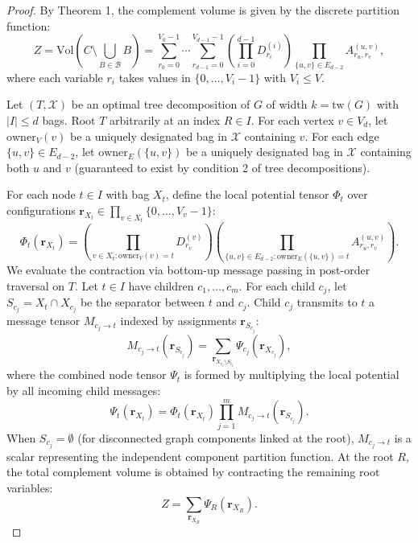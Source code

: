 \documentclass[11pt,a4paper]{article}
\theoremstyle{plain}
\theoremstyle{definition}
\begin{document}
\begin{proof}
By Theorem 1, the complement volume is given by the discrete partition function:
\begin{equation}
\label{eq:clean_partition}
Z = \mathrm{Vol}\left(C \setminus \bigcup_{B \in \mathcal{B}} B\right) = \sum_{r_0=0}^{V_0-1} \cdots \sum_{r_{d-1}=0}^{V_{d-1}-1} \left(\prod_{i=0}^{d-1} D^{(i)}_{r_i}\right) \prod_{\{u, v\} \in E_{d-2}} A^{(u, v)}_{r_u, r_v},
\end{equation}
where each variable $r_i$ takes values in $\{0, \dots, V_i - 1\}$ with $V_i \le V$.

Let $(T, \mathcal{X})$ be an optimal tree decomposition of $G$ of width $k = \mathrm{tw}(G)$ with $|I| \le d$ bags. Root $T$ arbitrarily at an index $R \in I$. For each vertex $v \in V_d$, let $\mathrm{owner}_V(v)$ be a uniquely designated bag in $\mathcal{X}$ containing $v$. For each edge $\{u, v\} \in E_{d-2}$, let $\mathrm{owner}_E(\{u, v\})$ be a uniquely designated bag in $\mathcal{X}$ containing both $u$ and $v$ (guaranteed to exist by condition 2 of tree decompositions).

For each node $t \in I$ with bag $X_t$, define the local potential tensor $\Phi_t$ over configurations $\mathbf{r}_{X_t} \in \prod_{v \in X_t} \{0, \dots, V_v - 1\}$:
\begin{equation}
\Phi_t(\mathbf{r}_{X_t}) = \left(\prod_{v \in X_t : \mathrm{owner}_V(v) = t} D^{(v)}_{r_v}\right) \left(\prod_{\{u, v\} \in E_{d-2} : \mathrm{owner}_E(\{u, v\}) = t} A^{(u, v)}_{r_u, r_v}\right).
\end{equation}
We evaluate the contraction via bottom-up message passing in post-order traversal on $T$. Let $t \in I$ have children $c_1, \dots, c_m$. For each child $c_j$, let $S_{c_j} = X_t \cap X_{c_j}$ be the separator between $t$ and $c_j$. Child $c_j$ transmits to $t$ a message tensor $M_{c_j \to t}$ indexed by assignments $\mathbf{r}_{S_{c_j}}$:
\begin{equation}
M_{c_j \to t}(\mathbf{r}_{S_{c_j}}) = \sum_{\mathbf{r}_{X_{c_j} \setminus S_{c_j}}} \Psi_{c_j}(\mathbf{r}_{X_{c_j}}),
\end{equation}
where the combined node tensor $\Psi_t$ is formed by multiplying the local potential by all incoming child messages:
\begin{equation}
\Psi_t(\mathbf{r}_{X_t}) = \Phi_t(\mathbf{r}_{X_t}) \prod_{j=1}^m M_{c_j \to t}(\mathbf{r}_{S_{c_j}}).
\end{equation}
When $S_{c_j} = \emptyset$ (for disconnected graph components linked at the root), $M_{c_j \to t}$ is a scalar representing the independent component partition function.
At the root $R$, the total complement volume is obtained by contracting the remaining root variables:
\begin{equation}
Z = \sum_{\mathbf{r}_{X_R}} \Psi_R(\mathbf{r}_{X_R}).
\end{equation}


\end{proof}
\end{document}
